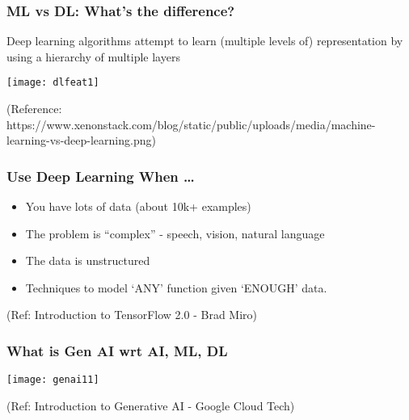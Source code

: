 \begin{frame}[fragile] \frametitle{ML vs DL: What's the difference?}
Deep learning algorithms attempt to learn (multiple levels of) representation by using a hierarchy of multiple layers
\begin{center}
\texttt{[image: dlfeat1]}
\end{center}
\tiny{(Reference: https://www.xenonstack.com/blog/static/public/uploads/media/machine-learning-vs-deep-learning.png)}

\end{frame}

\begin{frame}[fragile] \frametitle{Use Deep Learning When \ldots}

\begin{itemize}
\item You have lots of data (about 10k+ examples)
\item The problem is ``complex'' - speech, vision, natural language
\item The data is unstructured 
\item Techniques to model `ANY' function given `ENOUGH' data.
\end{itemize}
\tiny{(Ref: Introduction to TensorFlow 2.0 - Brad Miro)}
\end{frame}



\begin{frame}[fragile]\frametitle{What is Gen AI wrt AI, ML, DL}

\begin{center}
\texttt{[image: genai11]}
\end{center}

{\tiny (Ref: Introduction to Generative AI - Google Cloud Tech)}

\end{frame}

